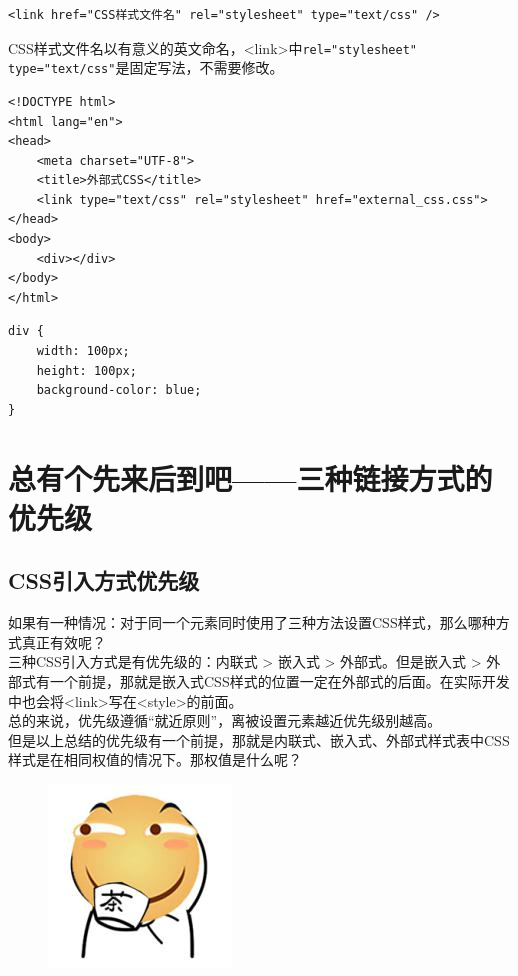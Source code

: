 \begin{lstlisting}[style=htmlcssjs]
<link href="CSS样式文件名" rel="stylesheet" type="text/css" />
\end{lstlisting}

CSS样式文件名以有意义的英文命名，<link>中\lstinline|rel="stylesheet" type="text/css"|是固定写法，不需要修改。 \\

\begin{lstlisting}[style=htmlcssjs, title=external\_css.html]
<!DOCTYPE html>
<html lang="en">
<head>
    <meta charset="UTF-8">
    <title>外部式CSS</title>
    <link type="text/css" rel="stylesheet" href="external_css.css">
</head>
<body>
    <div></div>
</body>
</html>
\end{lstlisting}

\begin{lstlisting}[style=htmlcssjs, title=external\_css.css]
div {
    width: 100px;
    height: 100px;
    background-color: blue;
}
\end{lstlisting}

\newpage

\section{总有个先来后到吧——三种链接方式的优先级}

\subsection{CSS引入方式优先级}

如果有一种情况：对于同一个元素同时使用了三种方法设置CSS样式，那么哪种方式真正有效呢？ \\

三种CSS引入方式是有优先级的：内联式 > 嵌入式 > 外部式。但是嵌入式 > 外部式有一个前提，那就是嵌入式CSS样式的位置一定在外部式的后面。在实际开发中也会将<link>写在<style>的前面。 \\

总的来说，优先级遵循“就近原则”，离被设置元素越近优先级别越高。 \\

但是以上总结的优先级有一个前提，那就是内联式、嵌入式、外部式样式表中CSS样式是在相同权值的情况下。那权值是什么呢？

\begin{figure}[H]
	\centering
	\includegraphics[]{img/C5/5-5/1.png}
\end{figure}

